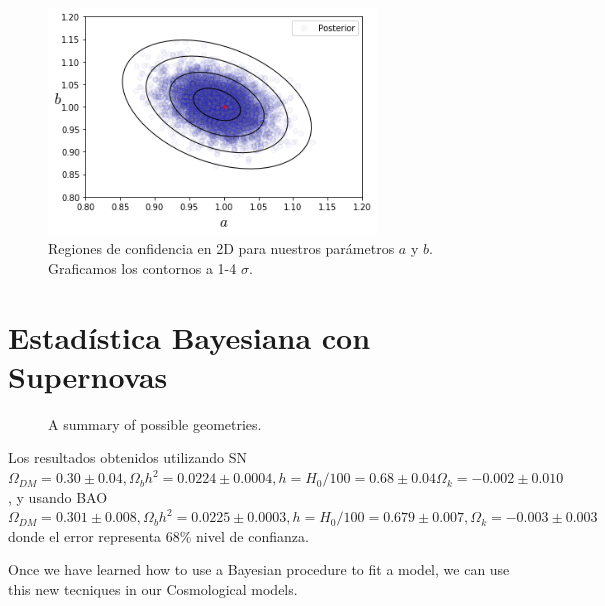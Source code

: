 \documentclass[10.5pt,prb,
               showpacs,            %
               preprintnumbers,     %
               aps,                 %
               prl,          	    %
               letterpaper,             %
               superscriptaddress,      %
               nofootinbib,         %
               tightenlines,        %
               floats,floatfix      %
               ,usenatbib]{revtex4-1}%
\newcommand{\jav}[1]{\textcolor{red}{(jav: #1)}}
\begin{document}
\begin{figure}[ht] 
\includegraphics[trim = 1mm  1mm 1mm 1mm, clip, width=6.cm, height=6cm]{cab.png}
\caption{Regiones de confidencia en 2D para nuestros par\'ametros $a$ y $b$. Graficamos los contornos a 1-4 $\sigma$.}%
\label{confidence}
\end{figure}


\section{Estad\'istica Bayesiana con Supernovas}



\begin{figure}[th]
\begin{center}
\end{center}
\caption[Geometries of the spacetime]
{A summary of possible geometries.}
\label{Fig:cmb_sh}
\end{figure}

Los resultados obtenidos utilizando SN $\Omega_{DM} =0.30 \pm 0.04, \Omega_b h^2 = 0.0224 \pm 0.0004, h = H_0/100 = 0.68 \pm 0.04
\Omega_k = -0.002 \pm 0.010$, y usando BAO 
$\Omega_{DM} = 0.301 \pm 0.008,   \Omega_b h^2 = 0.0225 \pm 0.0003,  h = H_0/100 = 0.679 \pm 0.007, 
\Omega_k = -0.003 \pm 0.003$ donde el error representa 68\% nivel de confianza.



Once we have learned how to use a Bayesian procedure to fit a model, we can use this new tecniques in our Cosmological models. 



\end{document}
